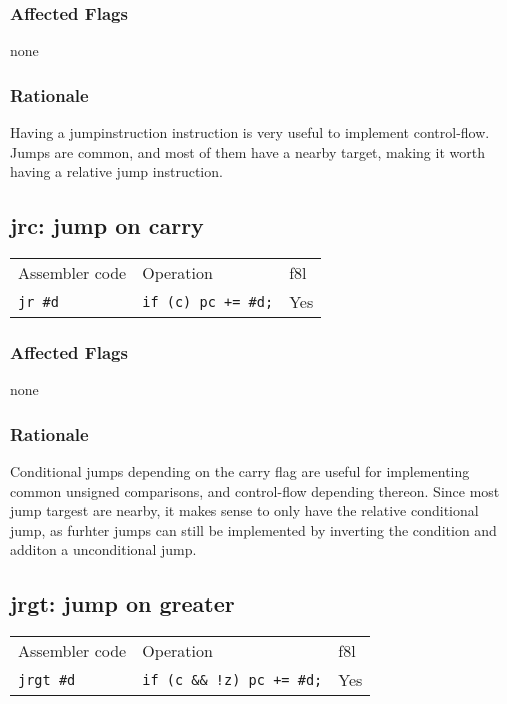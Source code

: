 \documentclass{book}
\begin{document}
\subsubsection*{Affected Flags}

none

\subsubsection*{Rationale}

Having a jumpinstruction instruction is very useful to implement control-flow. Jumps are common, and most of them have a nearby target, making it worth having a relative jump instruction.


\subsection{jrc: jump on carry}

\begin{tabular}{l l l}
Assembler code  & Operation                  & f8l \\
\texttt{jr \#d} & \texttt{if (c) pc += \#d;} & Yes \\
\end{tabular}

\subsubsection*{Affected Flags}

none

\subsubsection*{Rationale}

Conditional jumps depending on the carry flag are useful for implementing common unsigned comparisons, and control-flow depending thereon. Since most jump targest are nearby, it makes sense to only have the relative conditional jump, as furhter jumps can still be implemented by inverting the condition and additon a unconditional jump.


\subsection{jrgt: jump on greater}

\begin{tabular}{l l l}
Assembler code    & Operation                        & f8l \\
\texttt{jrgt \#d} & \texttt{if (c \&\& !z) pc += \#d;} & Yes \\
\end{tabular}
\end{document}
